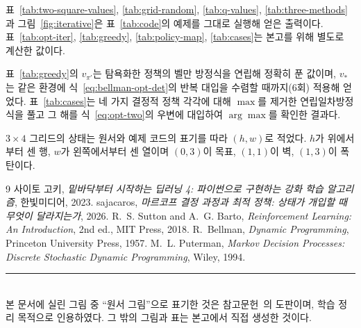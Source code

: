 \documentclass[11pt,a4paper]{article}
\begin{document}
표~\ref{tab:two-square-values}, \ref{tab:grid-random}, \ref{tab:q-values}, \ref{tab:three-methods}과
그림~\ref{fig:iterative}은 표~\ref{tab:code}의 예제를 그대로 실행해 얻은 출력이다.
표~\ref{tab:opt-iter}, \ref{tab:greedy}, \ref{tab:policy-map}, \ref{tab:cases}는 본고를 위해 별도로
계산한 값이다.

표~\ref{tab:greedy}의 $v_{\pi'}$는 탐욕화한 정책의 벨만 방정식을 연립해 정확히 푼 값이며,
$v_*$는 같은 환경에 식~\eqref{eq:bellman-opt-det}의 반복 대입을 수렴할 때까지(6회) 적용해 얻었다.
표~\ref{tab:cases}는 네 가지 결정적 정책 각각에 대해 $\max$를 제거한 연립일차방정식을 풀고 그 해를
식~\eqref{eq:opt-two}의 우변에 대입하여 $\arg\max$를 확인한 결과다.

$3\times4$ 그리드의 상태는 원서와 예제 코드의 표기를 따라 $(h,w)$로 적었다. $h$가 위에서부터 센 행,
$w$가 왼쪽에서부터 센 열이며 $(0,3)$이 목표, $(1,1)$이 벽, $(1,3)$이 폭탄이다.

\begin{thebibliography}{9}
사이토 고키, \emph{밑바닥부터 시작하는 딥러닝 4: 파이썬으로 구현하는 강화 학습 알고리즘}, 한빛미디어, 2023.
sajacaros, \emph{마르코프 결정 과정과 최적 정책: 상태가 개입할 때 무엇이 달라지는가}, 2026.
R.~S. Sutton and A.~G. Barto, \emph{Reinforcement Learning: An Introduction}, 2nd ed., MIT Press, 2018.
R.~Bellman, \emph{Dynamic Programming}, Princeton University Press, 1957.
M.~L. Puterman, \emph{Markov Decision Processes: Discrete Stochastic Dynamic Programming}, Wiley, 1994.
\end{thebibliography}

\vspace{4mm}
\noindent\rule{\linewidth}{0.4pt}\\
\footnotesize
본 문서에 실린 그림 중 ``원서 그림''으로 표기한 것은 참고문헌~\cite{dlfs4}의 도판이며, 학습 정리 목적으로
인용하였다. 그 밖의 그림과 표는 본고에서 직접 생성한 것이다.
\end{document}
